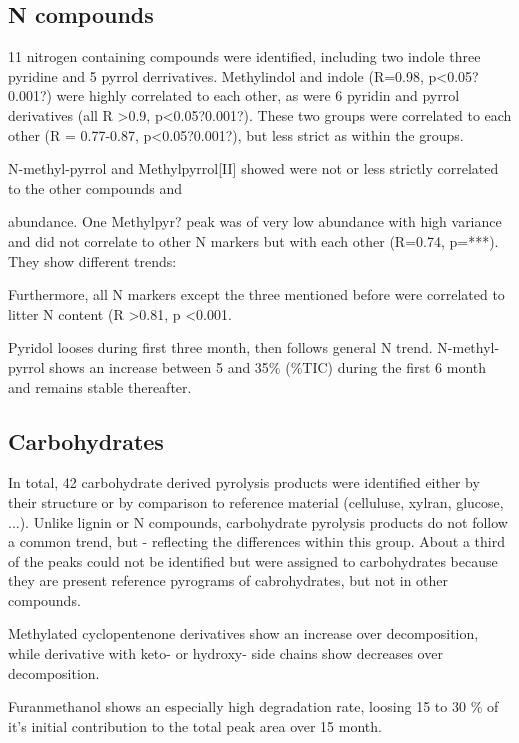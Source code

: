 \documentclass[preprint,review,12pt]{elsarticle}
\begin{document}
\subsection{N compounds}

11 nitrogen containing compounds were identified, including two indole three pyridine and 5 pyrrol derrivatives. Methylindol and indole (R=0.98, p\textless 0.05?0.001?) were highly correlated to each other, as were 6 pyridin and pyrrol derivatives (all R \textgreater 0.9, p\textless 0.05?0.001?). These two groups were correlated to each other (R = 0.77-0.87, p\textless 0.05?0.001?), but less strict as within the groups. 

N-methyl-pyrrol and Methylpyrrol[II] showed were not or less strictly correlated to the other compounds and 


 abundance. One Methylpyr? peak was of very low abundance with high variance and did not correlate to other N markers but with each other (R=0.74, p=***). They show different trends:



Furthermore, all N markers except the three mentioned before were correlated to litter N content (R \textgreater 0.81, p \textless 0.001.


Pyridol looses during first three month, then follows general N trend. 
N-methyl-pyrrol shows an increase between 5 and 35\% (\%TIC) during the first 6 month and remains stable thereafter.


\subsection{Carbohydrates}
In total, 42 carbohydrate derived pyrolysis products were identified either by their structure or by comparison to reference material (celluluse, xylran, glucose, ...). Unlike lignin or N compounds, carbohydrate pyrolysis products do not follow a common trend, but - reflecting the differences within this group. About a third of the peaks could not be identified but were assigned to carbohydrates because they are present reference pyrograms of cabrohydrates, but not in other compounds.

Methylated cyclopentenone derivatives show an increase over decomposition, while derivative with keto- or hydroxy- side chains show decreases over decomposition.

Furanmethanol shows an especially high degradation rate, loosing 15 to 30 \% of it's initial contribution to the total peak area over 15 month.
\end{document}
